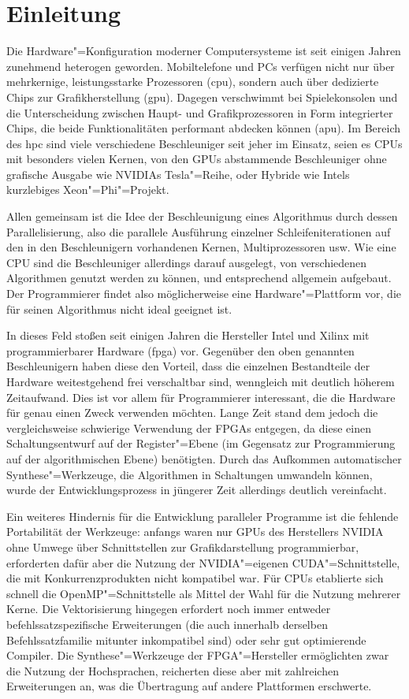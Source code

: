 \chapter{Einleitung}\label{einleitung}

Die Hardware"=Konfiguration moderner Computersysteme ist seit einigen Jahren
zunehmend heterogen geworden. Mobiltelefone und PCs verfügen nicht nur über
mehrkernige, leistungsstarke Prozessoren (\gls{cpu}), sondern auch über
dedizierte Chips zur Grafikherstellung (\gls{gpu}). Dagegen verschwimmt bei
Spielekonsolen und die Unterscheidung zwischen Haupt- und Grafikprozessoren in
Form integrierter Chips, die beide Funktionalitäten performant abdecken können
(\gls{apu}). Im Bereich des \gls{hpc} sind viele verschiedene Beschleuniger seit
jeher im Einsatz, seien es CPUs mit besonders vielen Kernen, von den GPUs
abstammende Beschleuniger ohne grafische Ausgabe wie NVIDIAs Tesla"=Reihe, oder
Hybride wie Intels kurzlebiges Xeon"=Phi"=Projekt.

Allen gemeinsam ist die Idee der Beschleunigung eines Algorithmus durch dessen
Parallelisierung, also die parallele Ausführung einzelner Schleifeniterationen
auf den in den Beschleunigern vorhandenen Kernen, Multiprozessoren usw. Wie eine
CPU sind die Beschleuniger allerdings darauf ausgelegt, von verschiedenen
Algorithmen genutzt werden zu können, und entsprechend allgemein aufgebaut. Der
Programmierer findet also möglicherweise eine Hardware"=Plattform vor, die für
seinen Algorithmus nicht ideal geeignet ist.

In dieses Feld stoßen seit einigen Jahren die Hersteller Intel und Xilinx mit
programmierbarer Hardware (\gls{fpga}) vor. Gegenüber den oben genannten
Beschleunigern haben diese den Vorteil, dass die einzelnen Bestandteile der
Hardware weitestgehend frei verschaltbar sind, wenngleich mit deutlich höherem
Zeitaufwand. Dies ist vor allem für Programmierer interessant, die die Hardware
für genau einen Zweck verwenden möchten. Lange Zeit stand dem jedoch die
vergleichsweise schwierige Verwendung der FPGAs entgegen, da diese einen
Schaltungsentwurf auf der Register"=Ebene (im Gegensatz zur Programmierung auf
der algorithmischen Ebene) benötigten. Durch das Aufkommen automatischer
Synthese"=Werkzeuge, die Algorithmen in Schaltungen umwandeln können, wurde der
Entwicklungsprozess in jüngerer Zeit allerdings deutlich vereinfacht.

Ein weiteres Hindernis für die Entwicklung paralleler Programme ist die
fehlende Portabilität der Werkzeuge: anfangs waren nur GPUs des Herstellers
NVIDIA ohne Umwege über Schnittstellen zur Grafikdarstellung programmierbar,
erforderten dafür aber die Nutzung der NVIDIA"=eigenen CUDA"=Schnittstelle, die
mit Konkurrenzprodukten nicht kompatibel war. Für CPUs etablierte sich schnell
die OpenMP"=Schnittstelle als Mittel der Wahl für die Nutzung mehrerer Kerne.
Die Vektorisierung hingegen erfordert noch immer entweder befehlssatzspezifische
Erweiterungen (die auch innerhalb derselben Befehlssatzfamilie mitunter
inkompatibel sind) oder sehr gut optimierende Compiler. Die Synthese"=Werkzeuge
der FPGA"=Hersteller ermöglichten zwar die Nutzung der Hochsprachen, reicherten
diese aber mit zahlreichen Erweiterungen an, was die Übertragung auf andere
Plattformen erschwerte.


